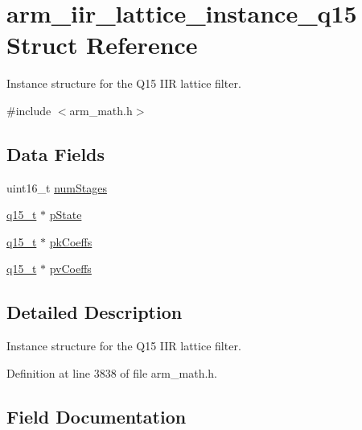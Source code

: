 \hypertarget{structarm__iir__lattice__instance__q15}{}\section{arm\+\_\+iir\+\_\+lattice\+\_\+instance\+\_\+q15 Struct Reference}
\label{structarm__iir__lattice__instance__q15}


Instance structure for the Q15 I\+IR lattice filter.  




{\ttfamily \#include $<$arm\+\_\+math.\+h$>$}

\subsection*{Data Fields}
\begin{DoxyCompactItemize}
\item 
uint16\+\_\+t \hyperlink{structarm__iir__lattice__instance__q15_a4cceb90547b3e585d4c7aabaa8057212}{num\+Stages}
\item 
\hyperlink{arm__math_8h_ab5a8fb21a5b3b983d5f54f31614052ea}{q15\+\_\+t} $\ast$ \hyperlink{structarm__iir__lattice__instance__q15_ae29dfdb736374fcddaeaec4b7770170c}{p\+State}
\item 
\hyperlink{arm__math_8h_ab5a8fb21a5b3b983d5f54f31614052ea}{q15\+\_\+t} $\ast$ \hyperlink{structarm__iir__lattice__instance__q15_a12497c299b0341c18d497f8ab3465084}{pk\+Coeffs}
\item 
\hyperlink{arm__math_8h_ab5a8fb21a5b3b983d5f54f31614052ea}{q15\+\_\+t} $\ast$ \hyperlink{structarm__iir__lattice__instance__q15_a52866ed127c7b2a8a102e2ed1a2ebab8}{pv\+Coeffs}
\end{DoxyCompactItemize}


\subsection{Detailed Description}
Instance structure for the Q15 I\+IR lattice filter. 

Definition at line 3838 of file arm\+\_\+math.\+h.



\subsection{Field Documentation}
